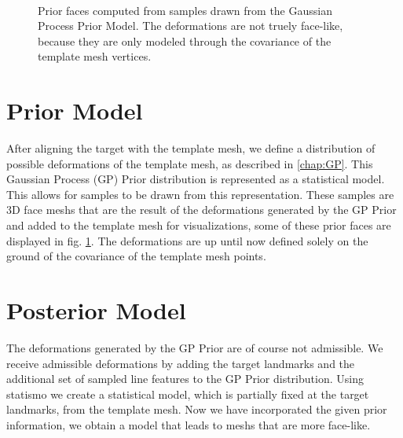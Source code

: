 \begin{figure}[h]
\centering
{}\\
\label{fig:priorprofile}
\caption{Prior faces computed from samples drawn from the Gaussian Process Prior Model. The deformations are not truely face-like, because they are only modeled through the covariance of the template mesh vertices.}
\end{figure}

\section{Prior Model}
After aligning the target with the template mesh, we define a distribution of possible deformations of the template mesh, as described in \ref{chap:GP}. This Gaussian Process (GP) Prior distribution is represented as a statistical model. This allows for samples to be drawn from this representation. These samples are 3D face meshs that are the result of the deformations generated by the GP Prior and added to the template mesh for visualizations, some of these prior faces are displayed in fig. \ref{fig:priorprofile}. The deformations are up until now defined solely on the ground of the covariance of the template mesh points.

\section{Posterior Model}
The deformations generated by the GP Prior are of course not admissible. We receive admissible deformations by adding the target landmarks and the additional set of sampled line features to the GP Prior distribution. Using statismo we create a statistical model, which is partially fixed at the target landmarks, from the template mesh. Now we have incorporated the given prior information, we obtain a model that leads to meshs that are more face-like.

